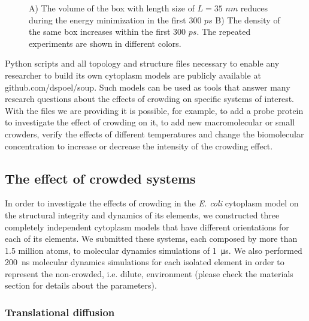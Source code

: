 \documentclass[journal=jacsat,manuscript=article]{achemso}
\begin{document}
\begin{figure}[H]

\caption{A) The volume of the box with length size of $L=35 \,\, nm$ reduces during the energy minimization in the first $300 \,\, ps$ B) The density of the same box increases within the first $300\,\, ps$. The repeated experiments are shown in different colors. }
\end{figure}



Python scripts and all topology and structure files necessary to enable any researcher to build its own cytoplasm models are publicly available at github.com/dspoel/soup. Such models can be used as tools that answer many research questions about the effects of crowding on specific systems of interest. With the files we are providing it is possible, for example, to add a probe protein to investigate the effect of crowding on it, to add new macromolecular or small crowders, verify the effects of different temperatures and change the biomolecular concentration to increase or decrease the intensity of the crowding effect.











\subsection{The effect of crowded systems}

In order to investigate the effects of crowding in the \textit{E. coli} cytoplasm model on the structural integrity and dynamics of its elements, we constructed three completely independent cytoplasm models that have different orientations for each of its elements. We submitted these systems, each composed by more than 1.5 million atoms, to molecular dynamics simulations of \SI{1}{\micro\second}. We also performed \SI{200}{\nano\second} molecular dynamics simulations for each isolated element in order to represent the non-crowded, i.e. dilute, environment (please check the materials section for details about the parameters).









\subsubsection{Translational diffusion}
\end{document}
